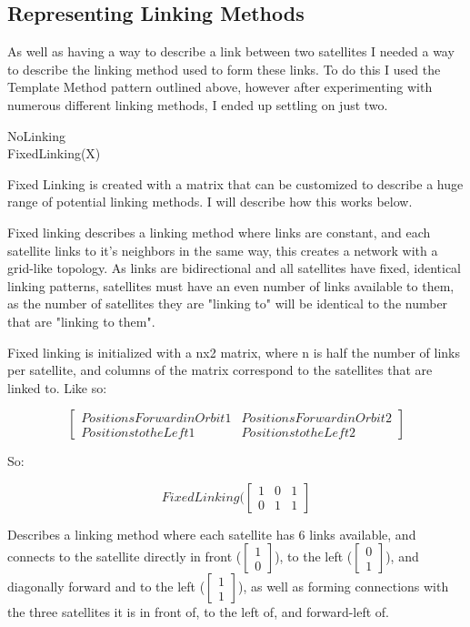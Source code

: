 \documentclass[12pt]{report}
\begin{document}
\subsection{Representing Linking Methods}
As well as having a way to describe a link between two satellites I needed a way to describe the linking method used to form these links. To do this I used the Template Method pattern outlined above, however after experimenting with numerous different linking methods, I ended up settling on just two.

\begin{description}
\item[NoLinking]
\item[FixedLinking(X)]
\end{description}

Fixed Linking is created with a matrix that can be customized to describe a huge range of potential linking methods. I will describe how this works below.

Fixed linking describes a linking method where links are constant, and each satellite links to it's neighbors in the same way, this creates a network with a grid-like topology. As links are bidirectional and all satellites have fixed, identical linking patterns, satellites must have an even number of links available to them, as the number of satellites they are "linking to" will be identical to the number that are "linking to them".

Fixed linking is initialized with a nx2 matrix, where n is half the number of links per satellite, and columns of the matrix correspond to the satellites that are linked to. Like so:

\[\begin{bmatrix} 
Positions Forward in Orbit 1 & Positions Forward in Orbit 2 \\
Positions to the Left 1 & Positions to the Left 2\end{bmatrix}\]

So:

\[FixedLinking(\begin{bmatrix} 
1 & 0 & 1 \\
0 & 1 & 1\end{bmatrix}\]

Describes a linking method where each satellite has 6 links available, and connects to the satellite directly in front ($\begin{bmatrix}1\\0\end{bmatrix}$), to the left ($\begin{bmatrix}0\\1\end{bmatrix}$), and diagonally forward and to the left ($\begin{bmatrix}1\\1\end{bmatrix}$), as well as forming connections with the three satellites it is in front of, to the left of, and forward-left of.
\end{document}
